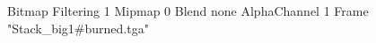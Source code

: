 {Bitmap
	{Filtering 1}
	{Mipmap 0}
	{Blend none}
	{AlphaChannel 1}
	{Frame "Stack_big1#burned.tga"}
}
